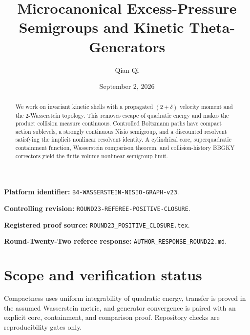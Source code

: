 \documentclass[11pt,reqno]{amsart}
\title[Kinetic excess-pressure semigroups]{Microcanonical Excess-Pressure Semigroups and Kinetic Theta-Generators}
\author{Qian Qi}
\date{September 2, 2026}
\theoremstyle{definition}
\theoremstyle{remark}
\begin{document}
\raggedbottom
\begin{abstract}
We work on invariant kinetic shells with a propagated $(2+\delta)$ velocity
moment and the $2$-Wasserstein topology.  This removes escape of quadratic
energy and makes the product collision measure continuous.  Controlled
Boltzmann paths have compact action sublevels, a strongly continuous Nisio
semigroup, and a discounted resolvent satisfying the implicit nonlinear
resolvent identity.  A cylindrical core, superquadratic containment function,
Wasserstein comparison theorem, and collision-history BBGKY correctors yield
the finite-volume nonlinear semigroup limit.
\end{abstract}
\maketitle
\noindent\textbf{Platform identifier:} \texttt{B4-WASSERSTEIN-NISIO-GRAPH-v23}.\par
\noindent\textbf{Controlling revision:} \texttt{ROUND23-REFEREE-POSITIVE-CLOSURE}.\par
\noindent\textbf{Registered proof source:} \texttt{ROUND23\_POSITIVE\_CLOSURE.tex}.\par
\noindent\textbf{Round-Twenty-Two referee response:} \texttt{AUTHOR\_RESPONSE\_ROUND22.md}.\par
\tableofcontents

\section*{Scope and verification status}
Compactness uses uniform integrability of quadratic energy, transfer is proved
in the assumed Wasserstein metric, and generator convergence is paired with an
explicit core, containment, and comparison proof. Repository checks are
reproducibility gates only.
\printbibliography
\end{document}
